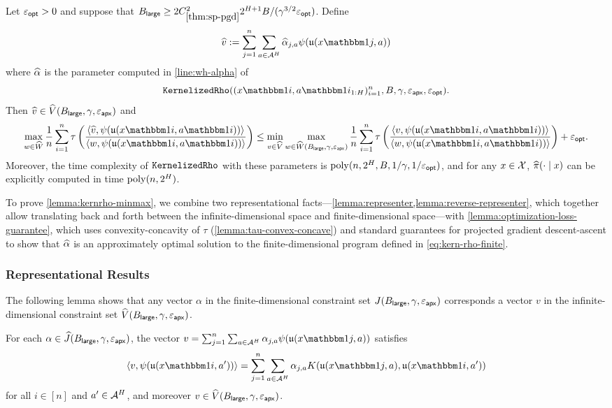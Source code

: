 \begin{lemma}\label{lemma:kernrho-minmax}
Let $\varepsilon_{\mathsf{opt}}>0$ and suppose that $B_{\mathsf{large}} \geq 2C_{\ref{thm:sp-pgd}}^2 2^{H+1}B/(\gamma^{3/2}\varepsilon_{\mathsf{opt}})$. Define \[\wh v := \sum_{j=1}^n \sum_{a\in\MA^H} \wh \alpha_{j,a} \psi(\uop{x\ind{j}}{a})\] where $\widehat{\alpha}$ is the parameter computed in \cref{line:wh-alpha} of \[\KernRho((x\ind{i},a\ind{i}_{1:H})_{i=1}^n, B,\gamma,\epapx,\epopt).\]
Then $\widehat{v} \in \widehat{V}(B_{\mathsf{large}},\gamma,\varepsilon_{\mathsf{apx}})$ and
\[\max_{w \in \wh W} \frac{1}{n} \sum_{i=1}^n \tau\left(\frac{\langle \wh v, \psi(\uop{x\ind{i}}{a\ind{i}})\rangle}{\langle w, \psi(\uop{x\ind{i}}{a\ind{i}})\rangle}\right) \leq \min_{v\in\wh V} \max_{w \in \wh W(\Blarge,\gamma,\epapx)} \frac{1}{n} \sum_{i=1}^n \tau\left(\frac{\langle v, \psi(\uop{x\ind{i}}{a\ind{i}})\rangle}{\langle w, \psi(\uop{x\ind{i}}{a\ind{i}})\rangle}\right) + \epopt.\]
Moreover, the time complexity of $\texttt{KernelizedRho}$ with these parameters is $\mathrm{poly}(n,2^H,B,1/\gamma,1/\varepsilon_{\mathsf{opt}})$, and for any $x\in\mathcal{X}$, $\widehat{\pi}(\cdot\mid{}x)$ can be explicitly computed in time $\mathrm{poly}(n,2^H)$.
\end{lemma}

To prove \cref{lemma:kernrho-minmax}, we combine two representational facts---\cref{lemma:representer,lemma:reverse-representer}, which together allow translating back and forth between the infinite-dimensional space and finite-dimensional space---with \cref{lemma:optimization-loss-guarantee}, which uses convexity-concavity of $\tau$ (\cref{lemma:tau-convex-concave}) and standard guarantees for projected gradient descent-ascent to show that $\widehat{\alpha}$ is an approximately optimal solution to the finite-dimensional program defined in \cref{eq:kern-rho-finite}.

\subsubsection{Representational Results}

The following lemma shows that any vector $\alpha$ in the finite-dimensional constraint set $J(B_{\mathsf{large}},\gamma,\varepsilon_{\mathsf{apx}})$ corresponds a vector $v$ in the infinite-dimensional constraint set $\widehat{V}(B_{\mathsf{large}},\gamma,\varepsilon_{\mathsf{apx}})$.

\begin{lemma}\label{lemma:reverse-representer}
For each $\alpha \in \widehat{J}(B_{\mathsf{large}},\gamma,\varepsilon_{\mathsf{apx}})$, the vector $v = \sum_{j=1}^n \sum_{a \in \MA^H} \alpha_{j,a} \psi(\uop{x\ind{j}}{a})$ satisfies 
\[\langle v, \psi(\uop{x\ind{i}}{a'})\rangle = \sum_{j=1}^n \sum_{a \in \MA^H} \alpha_{j,a} K(\uop{x\ind{j}}{a},\uop{x\ind{i}}{a'})\]
for all $i \in [n]$ and $a' \in \mathcal{A}^H$, and moreover $v \in \widehat{V}(B_{\mathsf{large}},\gamma,\varepsilon_{\mathsf{apx}})$.
\end{lemma}


